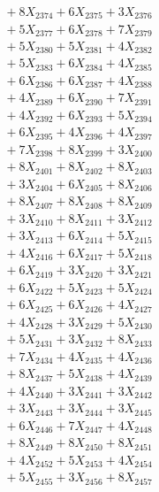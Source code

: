\documentclass[a4paper,10pt]{article}
\begin{document}
{\begin{align}
&\;  + 8 X_{2374} + 6 X_{2375} + 3 X_{2376} \\[0.3ex]
&\;  + 5 X_{2377} + 6 X_{2378} + 7 X_{2379} \\[0.5ex]\allowbreak
&\;  + 5 X_{2380} + 5 X_{2381} + 4 X_{2382} \\[0.3ex]
&\;  + 5 X_{2383} + 6 X_{2384} + 4 X_{2385} \\[0.3ex]
&\;  + 6 X_{2386} + 6 X_{2387} + 4 X_{2388} \\[0.3ex]
&\;  + 4 X_{2389} + 6 X_{2390} + 7 X_{2391} \\[0.3ex]
&\;  + 4 X_{2392} + 6 X_{2393} + 5 X_{2394} \\[0.3ex]
&\;  + 6 X_{2395} + 4 X_{2396} + 4 X_{2397} \\[0.3ex]
&\;  + 7 X_{2398} + 8 X_{2399} + 3 X_{2400} \\[0.3ex]
&\;  + 8 X_{2401} + 8 X_{2402} + 8 X_{2403} \\[0.3ex]
&\;  + 3 X_{2404} + 6 X_{2405} + 8 X_{2406} \\[0.3ex]
&\;  + 8 X_{2407} + 8 X_{2408} + 8 X_{2409} \\[0.5ex]\allowbreak
&\;  + 3 X_{2410} + 8 X_{2411} + 3 X_{2412} \\[0.3ex]
&\;  + 3 X_{2413} + 6 X_{2414} + 5 X_{2415} \\[0.3ex]
&\;  + 4 X_{2416} + 6 X_{2417} + 5 X_{2418} \\[0.3ex]
&\;  + 6 X_{2419} + 3 X_{2420} + 3 X_{2421} \\[0.3ex]
&\;  + 6 X_{2422} + 5 X_{2423} + 5 X_{2424} \\[0.3ex]
&\;  + 6 X_{2425} + 6 X_{2426} + 4 X_{2427} \\[0.3ex]
&\;  + 4 X_{2428} + 3 X_{2429} + 5 X_{2430} \\[0.3ex]
&\;  + 5 X_{2431} + 3 X_{2432} + 8 X_{2433} \\[0.3ex]
&\;  + 7 X_{2434} + 4 X_{2435} + 4 X_{2436} \\[0.3ex]
&\;  + 8 X_{2437} + 5 X_{2438} + 4 X_{2439} \\[0.5ex]\allowbreak
&\;  + 4 X_{2440} + 3 X_{2441} + 3 X_{2442} \\[0.3ex]
&\;  + 3 X_{2443} + 3 X_{2444} + 3 X_{2445} \\[0.3ex]
&\;  + 6 X_{2446} + 7 X_{2447} + 4 X_{2448} \\[0.3ex]
&\;  + 8 X_{2449} + 8 X_{2450} + 8 X_{2451} \\[0.3ex]
&\;  + 4 X_{2452} + 5 X_{2453} + 4 X_{2454} \\[0.3ex]
&\;  + 5 X_{2455} + 3 X_{2456} + 8 X_{2457} \\[0.3ex]

\end{align}}
\end{document}
